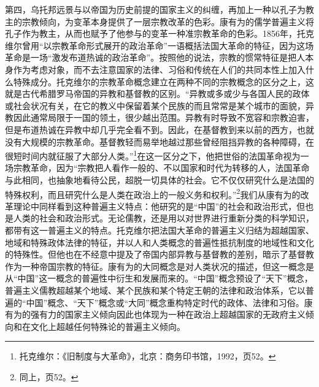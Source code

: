 \documentclass[a4paper, 12pt, openright]{ctexbook}
\begin{document}
第四，乌托邦远景与以帝国为历史前提的国家主义的纠缠，再加上一种以孔子为教主的宗教倾向，为变革本身提供了一层宗教改革的色彩。康有为的儒学普遍主义将孔子作为教主，从而也赋予了他参与的变革一种准宗教革命的色彩。1856年，托克维尔曾用“以宗教革命形式展开的政治革命”一语概括法国大革命的特征，因为这场革命是一场“激发布道热诚的政治革命”。按照他的说法，宗教的惯常特征是把人本身作为考虑对象，而不去注意国家的法律、习俗和传统在人们的共同本性上加入什么特殊成分。托克维尔的宗教革命概念建立在两种不同的宗教概念的区分之上，这就是古代希腊罗马帝国的异教和基督教的区别。“异教或多或少与各国人民的政体或社会状况有关，在它的教义中保留着某个民族的而且常常是某个城市的面貌，异教因此通常局限于一国的领土，很少越出范围。异教有时导致不宽容和宗教迫害，但是布道热诚在异教中却几乎完全看不到。因此，在基督教到来以前的西方，也就没有大规模的宗教革命。基督教轻而易举地越过那些曾经阻挡异教的各种障碍，在很短时间内就征服了大部分人类。”\footnote{托克维尔：《旧制度与大革命》，北京：商务印书馆，1992，页52。}在这一区分之下，他把世俗的法国革命视为一场宗教革命，因为“宗教把人看作一般的、不以国家和时代为转移的人，法国革命与此相同，也抽象地看待公民，超脱一切具体的社会。它不仅仅研究什么是法国的特殊权利，而且研究什么是人类在政治上的一般义务和权利。”\footnote{同上，页52。}我们从康有为的改革理论中同样看到这种普遍主义特点：他研究的是“中国”的社会和政治形式，但也是人类的社会和政治形式。无论儒教，还是用以对世界进行重新分类的科学知识，都带有这一普遍主义的特点。托克维尔把法国大革命的普遍主义归结为超越国家、地域和特殊政体法律的特征，并以人和人类概念的普遍性抵抗制度的地域性和文化的特殊性。但他也在不经意中提及了帝国内部异教与基督教的差别，暗示了基督教作为一种帝国宗教的特征。康有为的大同概念是对人类状况的描述，但这一概念是从“中国”这一概念的普遍性中衍生和发展而来的。“中国”概念预设了“天下”概念，普遍主义儒教超越某个地域、某个民族和某个特定王朝的法律和政治体系，它以普遍的“中国”概念、“天下”概念或“大同”概念重构特定时代的政体、法律和习俗。康有为的强有力的国家主义倾向因此也体现为一种在政治上超越国家的无政府主义倾向和在文化上超越任何特殊论的普遍主义倾向。
\end{document}
